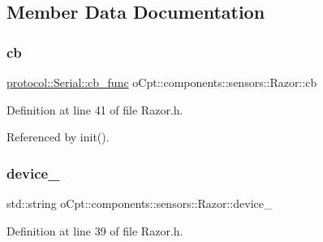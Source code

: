 \subsection{Member Data Documentation}
\hypertarget{classo_cpt_1_1components_1_1sensors_1_1_razor_a3fc69162ed59373f966458f2a5e30311}{}\label{classo_cpt_1_1components_1_1sensors_1_1_razor_a3fc69162ed59373f966458f2a5e30311} 
\subsubsection{\texorpdfstring{cb}{cb}}
{\footnotesize\ttfamily \hyperlink{classo_cpt_1_1protocol_1_1_serial_ad55591180be8bea2fe3832b1265b7496}{protocol\+::\+Serial\+::cb\+\_\+func} o\+Cpt\+::components\+::sensors\+::\+Razor\+::cb\hspace{0.3cm}{\ttfamily [private]}}



Definition at line 41 of file Razor.\+h.



Referenced by init().

\hypertarget{classo_cpt_1_1components_1_1sensors_1_1_razor_af566e421b9ea1378e19cffd6bd743860}{}\label{classo_cpt_1_1components_1_1sensors_1_1_razor_af566e421b9ea1378e19cffd6bd743860} 
\subsubsection{\texorpdfstring{device\+\_\+}{device\_}}
{\footnotesize\ttfamily std\+::string o\+Cpt\+::components\+::sensors\+::\+Razor\+::device\+\_\+\hspace{0.3cm}{\ttfamily [private]}}



Definition at line 39 of file Razor.\+h.

\hypertarget{classo_cpt_1_1components_1_1sensors_1_1_razor_a7b71014d6a35c9b9f24b636bd3f6471c}{}\label{classo_cpt_1_1components_1_1sensors_1_1_razor_a7b71014d6a35c9b9f24b636bd3f6471c} 
